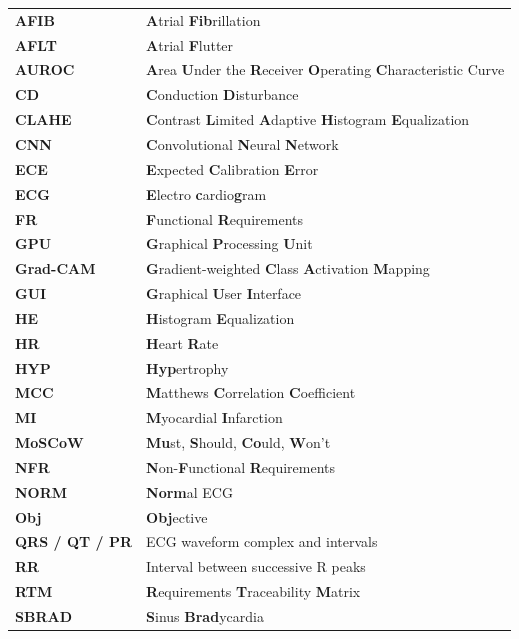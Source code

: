 \documentclass[oneside,a4paper,11pt]{book}
\begin{document}
\begin{table}[!h]
\begin{tabular}{ll}
\textbf{AFIB} & \textbf{A}trial \textbf{Fib}rillation \\
\textbf{AFLT} & \textbf{A}trial \textbf{F}lutter \\
\textbf{AUROC} & \textbf{A}rea \textbf{U}nder the \textbf{R}eceiver \textbf{O}perating \textbf{C}haracteristic Curve \\
\textbf{CD} & \textbf{C}onduction \textbf{D}isturbance \\
\textbf{CLAHE} & \textbf{C}ontrast \textbf{L}imited \textbf{A}daptive \textbf{H}istogram \textbf{E}qualization \\
\textbf{CNN} & \textbf{C}onvolutional \textbf{N}eural \textbf{N}etwork \\
\textbf{ECE} & \textbf{E}xpected \textbf{C}alibration \textbf{E}rror \\
\textbf{ECG} & \textbf{E}lectro \textbf{c}ardio\textbf{g}ram \\
\textbf{FR} & \textbf{F}unctional \textbf{R}equirements\\
\textbf{GPU} & \textbf{G}raphical \textbf{P}rocessing \textbf{U}nit \\
\textbf{Grad-CAM} & \textbf{G}radient-weighted \textbf{C}lass \textbf{A}ctivation \textbf{M}apping \\
\textbf{GUI} & \textbf{G}raphical \textbf{U}ser \textbf{I}nterface \\
\textbf{HE} & \textbf{H}istogram \textbf{E}qualization\\
\textbf{HR} & \textbf{H}eart \textbf{R}ate\\
\textbf{HYP} & \textbf{Hyp}ertrophy \\
\textbf{MCC} & \textbf{M}atthews \textbf{C}orrelation \textbf{C}oefficient \\
\textbf{MI} & \textbf{M}yocardial \textbf{I}nfarction \\
\textbf{MoSCoW} & \textbf{Mu}st, \textbf{S}hould, \textbf{Co}uld, \textbf{W}on't \\
\textbf{NFR} & \textbf{N}on-\textbf{F}unctional \textbf{R}equirements\\
\textbf{NORM} & \textbf{Norm}al ECG \\
\textbf{Obj} & \textbf{Obj}ective \\
\textbf{QRS / QT / PR} & ECG waveform complex and intervals \\
\textbf{RR} & Interval between successive R peaks \\
\textbf{RTM} & \textbf{R}equirements \textbf{T}raceability \textbf{M}atrix \\
\textbf{SBRAD} & \textbf{S}inus \textbf{Brad}ycardia \\

\end{tabular}
\end{table}
\end{document}
